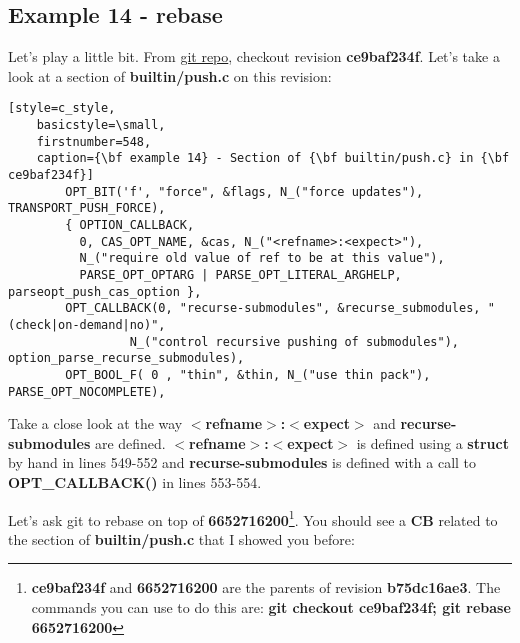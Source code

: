\subsection{Example 14 - rebase}

Let's play a little bit. From \hyperref[git_repo]{git repo}, checkout revision {\bf ce9baf234f}. Let's take a look at a
section of {\bf builtin/push.c} on this revision:

\begin{lstlisting}[style=c_style,
	basicstyle=\small,
	firstnumber=548,
	caption={\bf example 14} - Section of {\bf builtin/push.c} in {\bf ce9baf234f}]
		OPT_BIT('f', "force", &flags, N_("force updates"), TRANSPORT_PUSH_FORCE),
		{ OPTION_CALLBACK,
		  0, CAS_OPT_NAME, &cas, N_("<refname>:<expect>"),
		  N_("require old value of ref to be at this value"),
		  PARSE_OPT_OPTARG | PARSE_OPT_LITERAL_ARGHELP, parseopt_push_cas_option },
		OPT_CALLBACK(0, "recurse-submodules", &recurse_submodules, "(check|on-demand|no)",
			     N_("control recursive pushing of submodules"), option_parse_recurse_submodules),
		OPT_BOOL_F( 0 , "thin", &thin, N_("use thin pack"), PARSE_OPT_NOCOMPLETE),
\end{lstlisting}

Take a close look at the way {\bf $<$refname$>$:$<$expect$>$} and {\bf recurse-submodules} are defined. {\bf $<$refname$>$:$<$expect$>$}
is defined using a {\bf struct} by hand in lines 549-552 and {\bf recurse-submodules} is defined with a call to {\bf OPT\_CALLBACK()}
in lines 553-554.

Let's ask git to rebase on top of {\bf 6652716200}\footnote{{\bf ce9baf234f} and {\bf 6652716200} are the parents of revision
{\bf b75dc16ae3}. The commands you can use to do this are: {\bf git checkout ce9baf234f; git rebase 6652716200}}. You should
see a {\bf CB} related to the section of {\bf builtin/push.c} that I showed you before:

